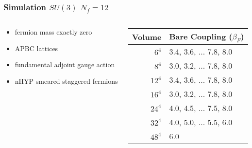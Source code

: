 \begin{frame}
  \frametitle{Simulation $SU(3)$ $N_f=12$}
  \begin{columns}[c]
    \begin{column}{0.5\textwidth}
      \begin{itemize}
        \item fermion mass exactly zero
        \item APBC lattices
        \item fundamental adjoint gauge action
        \item nHYP smeared staggered fermions
      \end{itemize}
    \end{column}
    \begin{column}{0.5\textwidth}
      \begin{tabular}{| r | l |}\hline
        Volume & Bare Coupling ($\beta_F$) \\\hline
        $6^4$  & 3.4, 3.6, ... 7.8, 8.0 \\
        $8^4$  & 3.0, 3.2, ... 7.8, 8.0 \\
        $12^4$ & 3.4, 3.6, ... 7.8, 8.0 \\
        $16^4$ & 3.0, 3.2, ... 7.8, 8.0 \\
        $24^4$ & 4.0, 4.5, ... 7.5, 8.0 \\
        $32^4$ & 4.0, 5.0, ... 5.5, 6.0 \\
        $48^4$ & 6.0 \\ \hline
      \end{tabular}
    \end{column}
  \end{columns}
\end{frame}

